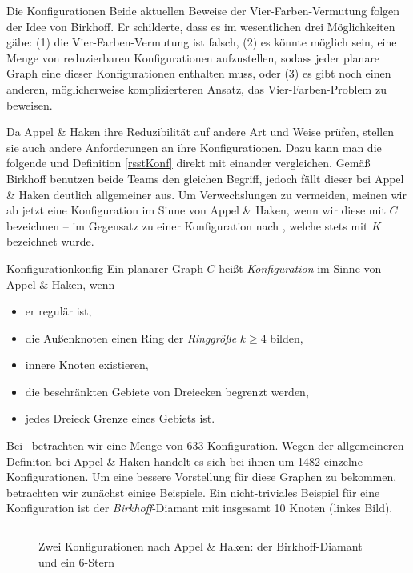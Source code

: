  \begin{section}{Die Konfigurationen}
  Beide aktuellen Beweise der Vier-Farben-Vermutung folgen der Idee von Birkhoff. Er schilderte, dass es im wesentlichen drei Möglichkeiten gäbe: (1) die Vier-Farben-Vermutung ist falsch, (2) es könnte möglich sein, eine Menge von reduzierbaren Konfigurationen aufzustellen, sodass jeder planare Graph eine dieser Konfigurationen enthalten muss, oder (3) es gibt noch einen anderen, möglicherweise komplizierteren Ansatz, das Vier-Farben-Problem zu beweisen. \cite{AH1}
   
   Da Appel \& Haken ihre Reduzibilität auf andere Art und Weise prüfen, stellen sie auch andere Anforderungen an ihre Konfigurationen. Dazu kann man die folgende und Definition \ref{rsstKonf} direkt mit einander vergleichen. Gemäß Birkhoff benutzen beide Teams den gleichen Begriff, jedoch fällt dieser bei Appel \& Haken deutlich allgemeiner aus. Um Verwechslungen zu vermeiden, meinen wir ab jetzt eine Konfiguration im Sinne von Appel \& Haken, wenn wir diese mit $C$ bezeichnen -- im Gegensatz zu einer Konfiguration nach \rsst, welche stets mit $K$ bezeichnet wurde.
   
   \begin{definitionl}{Konfiguration}{konfig}
    Ein planarer Graph $C$ heißt \textit{Konfiguration} im Sinne von Appel \& Haken, wenn
    \begin{itemize}
     \item er regulär ist,
     \item die Außenknoten einen Ring der \textit{Ringgröße} $k \geq 4$ bilden,
     \item innere Knoten existieren,
     \item die beschränkten Gebiete von Dreiecken begrenzt werden,
     \item jedes Dreieck Grenze eines Gebiets ist.
    \end{itemize}
   \end{definitionl}
   
   Bei \rsst\-\ betrachten wir eine Menge von 633 Konfiguration. Wegen der allgemeineren Definiton bei Appel \& Haken handelt es sich bei ihnen um 1482 einzelne Konfigurationen. Um eine bessere Vorstellung für diese Graphen zu bekommen, betrachten wir zunächst einige Beispiele. Ein nicht-triviales Beispiel für eine Konfiguration ist der \textit{Birkhoff}-Diamant mit insgesamt 10 Knoten (linkes Bild).
   
  \begin{figure}[hb]
   \label{AHkonfig}
    \[  \]
    \caption[Zwei Konfigurationen nach Appel \& Haken: der Birkhoff-Diamant und ein $6$-Stern]{Zwei Konfigurationen nach Appel \& Haken: der Birkhoff-Diamant und ein $6$-Stern}
  \end{figure}
   

\end{section}
